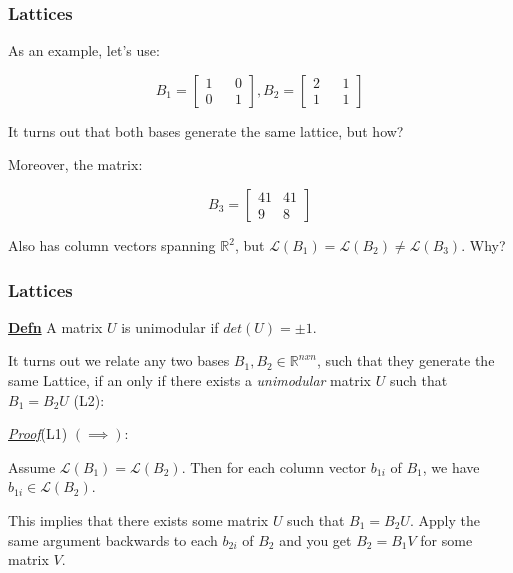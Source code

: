 \documentclass{beamer}
\newcommand{\lat}{\mathcal{L}}
\begin{document}
\begin{frame}
\frametitle{Lattices}

As an example, let's use:

\[ 
B_1 = \begin{bmatrix}
1 && 0 \\
0 && 1
\end{bmatrix}, B_2 = \begin{bmatrix}
2 && 1 \\
1 && 1
\end{bmatrix}
\]

It turns out that both bases generate the same lattice, but how?

Moreover, the matrix:

\[
B_3 = \begin{bmatrix}
41 & 41 \\
9 & 8
\end{bmatrix}
\]

Also has column vectors spanning $\mathbb{R}^2$, but $\mathcal{L}(B_1) = \mathcal{L}(B_2) \neq 
\lat(B_3)$. Why?


\end{frame}

\begin{frame}
\frametitle{Lattices}

\underline{\textbf{Defn}} A matrix $U$ is unimodular if $det(U) = \pm 1$.

It turns out we relate any two bases $B_1, B_2 \in \mathbb{R}^{nxn}$, such that they generate the same Lattice, if an only if there exists a \textit{unimodular} matrix $U$ such that $B_1 = B_2U$ (L2):
\vspace{1em}

\underline{\textit{Proof}}(L1) $(\implies)$:

\vspace{1em}

Assume $\mathcal{L}(B_1) = \mathcal{L}(B_2)$. Then for each column vector $b_{1i}$ of $B_1$, we have $b_{1i} \in \lat(B_2)$. 

This implies that there exists some matrix $U$ such that $B_1 = B_2U$. Apply the same argument backwards to each $b_{2i}$ of $B_2$ and you get $B_2 = B_1V$ for some matrix $V$.


\end{frame}
\end{document}
